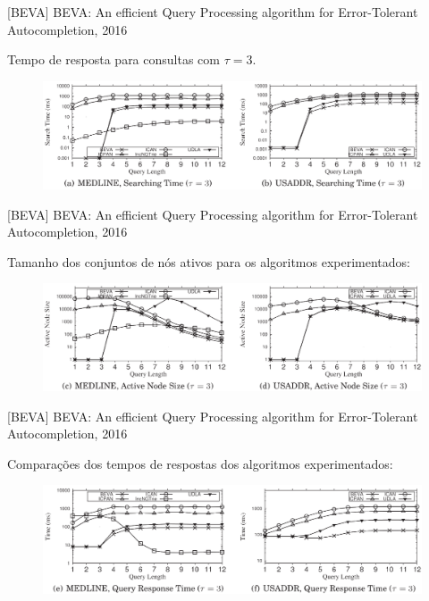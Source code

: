 \documentclass[11pt]{beamer}
\begin{document}
\begin{frame}{[BEVA] BEVA: An efficient Query Processing algorithm for Error-Tolerant Autocompletion, 2016}

    Tempo de resposta para consultas com $\tau = 3$.
    
    \begin{figure}
      \includegraphics[scale=0.30]{pictures/time_response_tau_3_beva.png}
      \centering
    \end{figure}
   
\end{frame}

\begin{frame}{[BEVA] BEVA: An efficient Query Processing algorithm for Error-Tolerant Autocompletion, 2016}

    Tamanho dos conjuntos de nós ativos para os algoritmos experimentados:
    
    \begin{figure}
      \includegraphics[scale=0.30]{pictures/active_node_size_beva.png}
      \centering
    \end{figure}
   
\end{frame}

\begin{frame}{[BEVA] BEVA: An efficient Query Processing algorithm for Error-Tolerant Autocompletion, 2016}

    Comparações dos tempos de respostas dos algoritmos experimentados:
    
    \begin{figure}
      \includegraphics[scale=0.30]{pictures/time_response_compare_beva.png}
      \centering
    \end{figure}
   
\end{frame}
\end{document}

